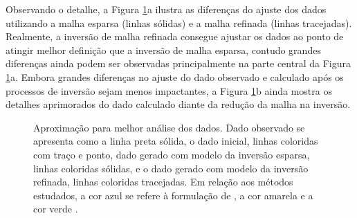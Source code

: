 Observando o detalhe, a Figura \ref{fig:zoom_in}a ilustra as diferenças do ajuste dos dados utilizando a malha esparsa (linhas sólidas) e a malha refinada (linhas tracejadas). Realmente, a inversão de malha refinada consegue ajustar os dados ao ponto de atingir melhor definição que a inversão de malha esparsa, contudo grandes diferenças ainda podem ser observadas principalmente na parte central da Figura \ref{fig:zoom_in}a. Embora grandes diferenças no ajuste do dado observado e calculado após os processos de inversão sejam menos impactantes, a Figura \ref{fig:zoom_in}b ainda mostra os detalhes aprimorados do dado calculado diante da redução da malha na inversão.

\begin{figure}[H]
	\centering
	
	\caption{Aproximação para melhor análise dos dados. Dado observado se apresenta como a linha preta sólida, o dado inicial, linhas coloridas com traço e ponto, dado gerado com modelo da inversão esparsa, linhas coloridas sólidas, e o dado gerado com modelo da inversão refinada, linhas coloridas tracejadas. Em relação aos métodos estudados, a cor azul se refere à formulação de , a cor amarela  e a cor verde .}
	\label{fig:zoom_in}
\end{figure}

